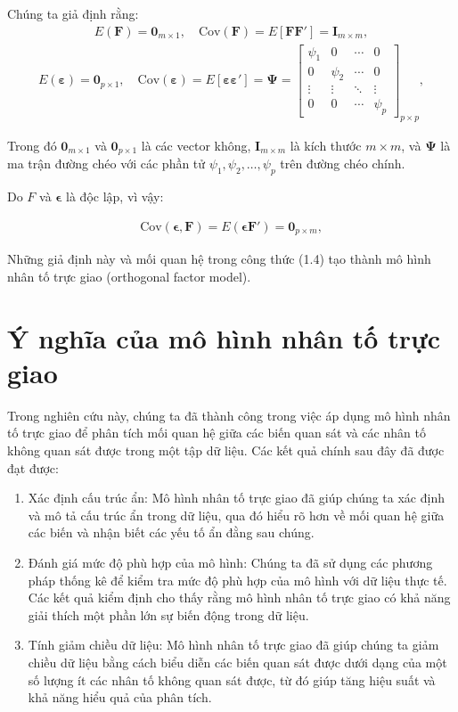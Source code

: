 Chúng ta giả định rằng:
\begin{eqnarray}
E(\mathbf{F}) = \mathbf{0}_{m \times 1}, \quad \text{Cov}(\mathbf{F}) = E[\mathbf{FF}'] = \mathbf{I}_{m \times m},
\end{eqnarray}
\begin{eqnarray}
E(\boldsymbol{\varepsilon}) = \mathbf{0}_{p \times 1}, \quad \text{Cov}(\boldsymbol{\varepsilon}) = E[\boldsymbol{\varepsilon} \boldsymbol{\varepsilon}'] = \boldsymbol{\Psi} =
\begin{bmatrix}
\psi_1 & 0 & \cdots & 0 \\
0 & \psi_2 & \cdots & 0 \\
\vdots & \vdots & \ddots & \vdots \\
0 & 0 & \cdots & \psi_p
\end{bmatrix}_{p \times p},
\end{eqnarray}

Trong đó \(\mathbf{0}_{m \times 1}\) và \(\mathbf{0}_{p \times 1}\) là các vector không, \(\mathbf{I}_{m \times m}\) là  kích thước \(m \times m\), và \(\boldsymbol{\Psi}\) là ma trận đường chéo với các phần tử \(\psi_1, \psi_2, \ldots, \psi_p\) trên đường chéo chính.

Do \(F\) và \(\boldsymbol{\epsilon}\) là độc lập, vì vậy:

\begin{eqnarray}
\text{Cov}(\boldsymbol{\epsilon}, \mathbf{F}) = E(\boldsymbol{\epsilon}\mathbf{F}') = \mathbf{0}_{p \times m},
\end{eqnarray}

Những giả định này và mối quan hệ trong công thức (1.4) tạo thành mô hình nhân tố trực giao (orthogonal factor model).

\section{Ý nghĩa của mô hình nhân tố trực giao}
Trong nghiên cứu này, chúng ta đã thành công trong việc áp dụng mô hình nhân tố trực giao để phân tích mối quan hệ giữa các biến quan sát và các nhân tố không quan sát được trong một tập dữ liệu. Các kết quả chính sau đây đã được đạt được:

\begin{enumerate}
    \item Xác định cấu trúc ẩn: Mô hình nhân tố trực giao đã giúp chúng ta xác định và mô tả cấu trúc ẩn trong dữ liệu, qua đó hiểu rõ hơn về mối quan hệ giữa các biến và nhận biết các yếu tố ẩn đằng sau chúng.
    \item Đánh giá mức độ phù hợp của mô hình: Chúng ta đã sử dụng các phương pháp thống kê để kiểm tra mức độ phù hợp của mô hình với dữ liệu thực tế. Các kết quả kiểm định cho thấy rằng mô hình nhân tố trực giao có khả năng giải thích một phần lớn sự biến động trong dữ liệu.
    \item Tính giảm chiều dữ liệu: Mô hình nhân tố trực giao đã giúp chúng ta giảm chiều dữ liệu bằng cách biểu diễn các biến quan sát được dưới dạng của một số lượng ít các nhân tố không quan sát được, từ đó giúp tăng hiệu suất và khả năng hiểu quả của phân tích.
\end{enumerate}

